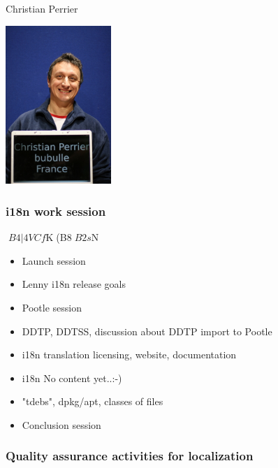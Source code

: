 \documentclass[cjk,dvipdfm,12pt]{beamer}
\begin{document}
{{{{{{{{\begin{frame}
\begin{minipage}{0.4\hsize}
\begin{itemize}
	Christian Perrier
    \end{itemize}
  \end{minipage}
  \begin{minipage}{0.4\hsize}
    \includegraphics[width=4cm]{image200707/bubulle.jpg}  
  \end{minipage}
\end{frame}

\begin{frame}
\frametitle{i18n work session} 
$B4|4VCf$K(B8$B2s$N%

  \begin{itemize}
     \item Launch session
     \item Lenny i18n release goals
     \item Pootle session
     \item DDTP, DDTSS, discussion about DDTP import to Pootle
     \item i18n  translation licensing, website, documentation
     \item i18n No content yet..:-)
     \item "tdebs", dpkg/apt, classes of files
     \item Conclusion session    
    
  \end{itemize}
\end{frame}

\begin{frame}
\frametitle{Quality assurance activities for localization} 
  \begin{minipage}{0.4\hsize}
\end{minipage}
\end{frame}}}}}}}}}
\end{document}
